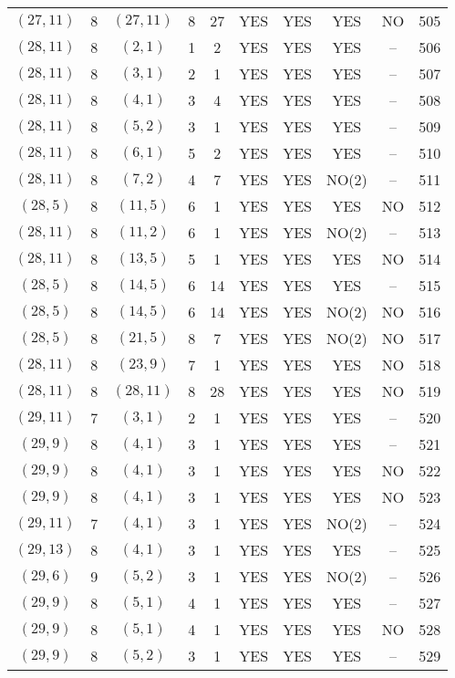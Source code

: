 \begin{longtable}{|c|c|c|c|c|c|c|c|c|c|}
$(27, 11)$ & 8 & $(27, 11)$ & 8 & 27 & YES & YES & YES & NO & 505\\
$(28, 11)$ & 8 & $(2, 1)$ & 1 & 2 & YES & YES & YES & -- & 506\\
$(28, 11)$ & 8 & $(3, 1)$ & 2 & 1 & YES & YES & YES & -- & 507\\
$(28, 11)$ & 8 & $(4, 1)$ & 3 & 4 & YES & YES & YES & -- & 508\\
$(28, 11)$ & 8 & $(5, 2)$ & 3 & 1 & YES & YES & YES & -- & 509\\
$(28, 11)$ & 8 & $(6, 1)$ & 5 & 2 & YES & YES & YES & -- & 510\\
$(28, 11)$ & 8 & $(7, 2)$ & 4 & 7 & YES & YES & NO(2) & -- & 511\\
$(28, 5)$ & 8 & $(11, 5)$ & 6 & 1 & YES & YES & YES & NO & 512\\
$(28, 11)$ & 8 & $(11, 2)$ & 6 & 1 & YES & YES & NO(2) & -- & 513\\
$(28, 11)$ & 8 & $(13, 5)$ & 5 & 1 & YES & YES & YES & NO & 514\\
$(28, 5)$ & 8 & $(14, 5)$ & 6 & 14 & YES & YES & YES & -- & 515\\
$(28, 5)$ & 8 & $(14, 5)$ & 6 & 14 & YES & YES & NO(2) & NO & 516\\
$(28, 5)$ & 8 & $(21, 5)$ & 8 & 7 & YES & YES & NO(2) & NO & 517\\
$(28, 11)$ & 8 & $(23, 9)$ & 7 & 1 & YES & YES & YES & NO & 518\\
$(28, 11)$ & 8 & $(28, 11)$ & 8 & 28 & YES & YES & YES & NO & 519\\
$(29, 11)$ & 7 & $(3, 1)$ & 2 & 1 & YES & YES & YES & -- & 520\\
$(29, 9)$ & 8 & $(4, 1)$ & 3 & 1 & YES & YES & YES & -- & 521\\
$(29, 9)$ & 8 & $(4, 1)$ & 3 & 1 & YES & YES & YES & NO & 522\\
$(29, 9)$ & 8 & $(4, 1)$ & 3 & 1 & YES & YES & YES & NO & 523\\
$(29, 11)$ & 7 & $(4, 1)$ & 3 & 1 & YES & YES & NO(2) & -- & 524\\
$(29, 13)$ & 8 & $(4, 1)$ & 3 & 1 & YES & YES & YES & -- & 525\\
$(29, 6)$ & 9 & $(5, 2)$ & 3 & 1 & YES & YES & NO(2) & -- & 526\\
$(29, 9)$ & 8 & $(5, 1)$ & 4 & 1 & YES & YES & YES & -- & 527\\
$(29, 9)$ & 8 & $(5, 1)$ & 4 & 1 & YES & YES & YES & NO & 528\\
$(29, 9)$ & 8 & $(5, 2)$ & 3 & 1 & YES & YES & YES & -- & 529\\

\end{longtable}
